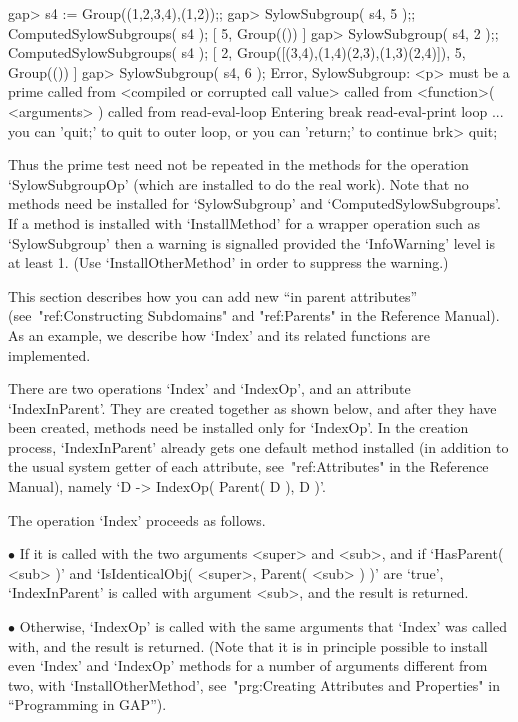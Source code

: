 \beginexample
gap> s4 := Group((1,2,3,4),(1,2));;
gap> SylowSubgroup( s4, 5 );;  ComputedSylowSubgroups( s4 );
[ 5, Group(()) ]
gap> SylowSubgroup( s4, 2 );;  ComputedSylowSubgroups( s4 );
[ 2, Group([(3,4),(1,4)(2,3),(1,3)(2,4)]), 5, Group(()) ]
\endexample
\begintt
gap> SylowSubgroup( s4, 6 );
Error, SylowSubgroup: <p> must be a prime called from
<compiled or corrupted call value>  called from
<function>( <arguments> ) called from read-eval-loop
Entering break read-eval-print loop ...
you can 'quit;' to quit to outer loop, or
you can 'return;' to continue
brk> quit;
\endtt

Thus the prime test need not be repeated in the methods for the operation
`SylowSubgroupOp' (which are installed to do the real work).
Note that no methods need be installed for `SylowSubgroup' and
`ComputedSylowSubgroups'.
If a method is installed with `InstallMethod' for a wrapper operation
such as `SylowSubgroup' then a warning is signalled
provided the `InfoWarning' level is at least 1.
(Use `InstallOtherMethod' in order to suppress the warning.)



This section describes how you can add  new ``in parent attributes''
(see~"ref:Constructing Subdomains" and "ref:Parents" in the Reference Manual).
As an example, we describe how `Index' and its related functions
are implemented.

There are two operations `Index' and `IndexOp',
and an attribute `IndexInParent'.
They are created together as shown below,
and after they have been created,
methods need be installed only for `IndexOp'.
In the creation process, `IndexInParent' already gets one default method
installed
(in addition to the usual system getter of each attribute,
see~"ref:Attributes" in the Reference Manual),
namely `D -> IndexOp( Parent( D ), D )'.

The operation `Index' proceeds as follows.
\beginlist%
\item{$\bullet$}
  If it is called with the two arguments <super> and <sub>, and if
  `HasParent( <sub> )' and `IsIdenticalObj( <super>, Parent( <sub> ) )'
  are `true', `IndexInParent' is called with argument <sub>,
  and the result is returned.
\item{$\bullet$}
  Otherwise, `IndexOp' is called with the same arguments that `Index' was
  called with, and the result is returned.
\endlist
(Note that it is in principle possible to install even `Index' and
`IndexOp' methods for a number of arguments different from two,
with `InstallOtherMethod',
see~"prg:Creating Attributes and Properties" in ``Programming in GAP'').

